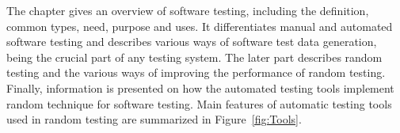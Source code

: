
The chapter gives an overview of software testing, including the definition, common types, need, purpose and uses. It differentiates manual and automated software testing and describes various ways of software test data generation, being the crucial part of any testing system. The later part describes random testing and the various ways of improving the performance of random testing. Finally, information is presented on how the automated testing tools implement random technique for software testing. Main features of automatic testing tools used in random testing are summarized in Figure~\ref{fig:Tools}.











